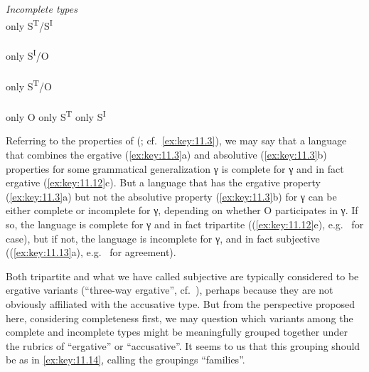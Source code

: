 \documentclass[output=paper]{langsci/langscibook}
\begin{document}
\ea%
    \label{ex:key:11.13} \emph{Incomplete types}\\
    \ea only S\textsuperscript{T}/S\textsuperscript{I}
         \\
         \\
         
	\ex only S\textsuperscript{I}/O
         \\
         \\
         
	\ex only S\textsuperscript{T}/O
         \\
         \\
         
    \ex only O                    \tab{} 
    \ex only S\textsuperscript{T} \tab{} 
    \ex only S\textsuperscript{I} \tab{} 
	\z
\z

Referring to the  properties of \citeauthor{Deal2015}
(\citeyear{Deal2015}; cf.\ \eqref{ex:key:11.3}), we may say that a language
that combines the ergative (\ref{ex:key:11.3}a) and absolutive
(\ref{ex:key:11.3}b) properties for some grammatical generalization γ is
complete for γ and in fact ergative (\ref{ex:key:11.12}c).  But a language that
has the ergative property (\ref{ex:key:11.3}a) but not the absolutive property
(\ref{ex:key:11.3}b) for γ can be either complete or incomplete for γ,
depending on whether O participates in γ. If so, the language is complete for γ
and in fact tripartite ((\ref{ex:key:11.12}e), e.g.\  for case),
but if not, the language is incomplete for γ, and in fact subjective
((\ref{ex:key:11.13}a), e.g.\  for agreement).

Both tripartite and what we have called subjective are typically considered to
be ergative variants (\enquote{three-way ergative}, cf.\ \citealt{Deal2015}),
perhaps because they are not obviously affiliated with the accusative type. But
from the perspective proposed here, considering completeness first, we may
question which variants among the complete and incomplete types might be
meaningfully grouped together under the rubrics of \enquote{ergative} or
\enquote{accusative}.  It seems to us that this grouping should be as in \eqref{ex:key:11.14},
calling the groupings \enquote{families}.
\end{document}

